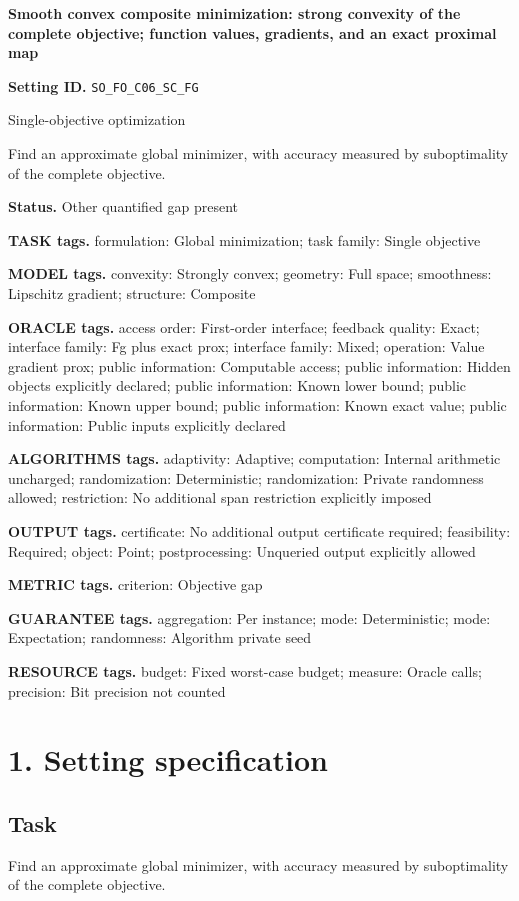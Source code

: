 \documentclass[10pt,a4paper]{article}
\begin{document}
\raggedright

{\LARGE\bfseries\sffamily\color{AtlasNavy} Smooth convex composite minimization: strong convexity of the complete objective; function values, gradients, and an exact proximal map\par}\vspace{5pt}
\textbf{Setting ID.} \texttt{SO\_\allowbreak{}FO\_\allowbreak{}C06\_\allowbreak{}SC\_\allowbreak{}FG}

Single-objective optimization

Find an approximate global minimizer, with accuracy measured by suboptimality of the complete objective.

\textbf{Status.} Other quantified gap present

\textbf{TASK tags.} formulation: Global minimization; task family: Single objective

\textbf{MODEL tags.} convexity: Strongly convex; geometry: Full space; smoothness: Lipschitz gradient; structure: Composite

\textbf{ORACLE tags.} access order: First-order interface; feedback quality: Exact; interface family: Fg plus exact prox; interface family: Mixed; operation: Value gradient prox; public information: Computable access; public information: Hidden objects explicitly declared; public information: Known lower bound; public information: Known upper bound; public information: Known exact value; public information: Public inputs explicitly declared

\textbf{ALGORITHMS tags.} adaptivity: Adaptive; computation: Internal arithmetic uncharged; randomization: Deterministic; randomization: Private randomness allowed; restriction: No additional span restriction explicitly imposed

\textbf{OUTPUT tags.} certificate: No additional output certificate required; feasibility: Required; object: Point; postprocessing: Unqueried output explicitly allowed

\textbf{METRIC tags.} criterion: Objective gap

\textbf{GUARANTEE tags.} aggregation: Per instance; mode: Deterministic; mode: Expectation; randomness: Algorithm private seed

\textbf{RESOURCE tags.} budget: Fixed worst-case budget; measure: Oracle calls; precision: Bit precision not counted

\section{1. Setting specification}
\subsection{Task}
Find an approximate global minimizer, with accuracy measured by suboptimality of the complete objective.
\end{document}
